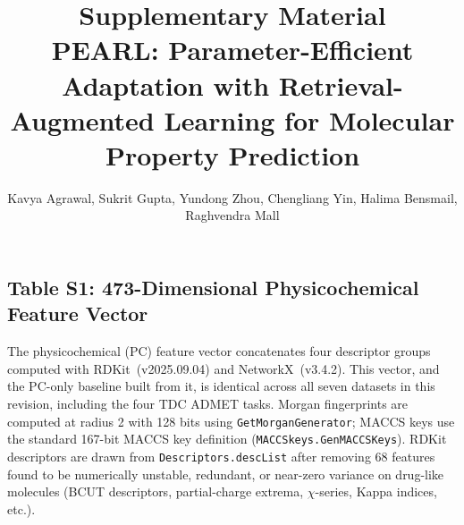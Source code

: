 \documentclass[9pt,a4paper]{article}
\title{\textbf{Supplementary Material}\\[4pt]
{\large PEARL: Parameter-Efficient Adaptation with
Retrieval-Augmented Learning for Molecular Property Prediction}}
\author{Kavya Agrawal, Sukrit Gupta, Yundong Zhou, Chengliang Yin, Halima Bensmail, Raghvendra Mall}
\date{}
\begin{document}
\maketitle
\tableofcontents
\newpage



\subsection*{Table S1: 473-Dimensional Physicochemical Feature Vector}

The physicochemical (PC) feature vector concatenates four descriptor groups computed
with RDKit~(v2025.09.04) and NetworkX~(v3.4.2). This vector, and the PC-only baseline built from it,
is identical across all seven datasets in this revision, including the four TDC
ADMET tasks.
Morgan fingerprints are computed at radius 2 with 128 bits using
\texttt{GetMorganGenerator}; MACCS keys use the standard 167-bit MACCS key
definition (\texttt{MACCSkeys.GenMACCSKeys}).
RDKit descriptors are drawn from \texttt{Descriptors.descList} after removing
68 features found to be numerically unstable, redundant, or near-zero variance
on drug-like molecules (BCUT descriptors, partial-charge extrema, $\chi$-series,
Kappa indices, etc.).
\end{document}
